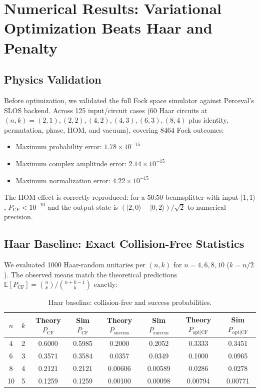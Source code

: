 \section{Numerical Results: Variational Optimization Beats Haar and Penalty}
\label{sec:results}

\subsection{Physics Validation}

Before optimization, we validated the full Fock space simulator against Perceval's SLOS backend. Across 125 input/circuit cases (60 Haar circuits at $(n,k)=(2,1),(2,2),(4,2),(4,3),(6,3),(8,4)$ plus identity, permutation, phase, HOM, and vacuum), covering 8464 Fock outcomes:
\begin{itemize}
\item Maximum probability error: $1.78 \times 10^{-15}$
\item Maximum complex amplitude error: $2.14 \times 10^{-15}$
\item Maximum normalization error: $4.22 \times 10^{-15}$
\end{itemize}
The HOM effect is correctly reproduced: for a 50:50 beamsplitter with input $|1,1\rangle$, $P_{\mathrm{CF}} < 10^{-10}$ and the output state is $(|2,0\rangle - |0,2\rangle)/\sqrt{2}$ to numerical precision.

\subsection{Haar Baseline: Exact Collision-Free Statistics}

We evaluated 1000 Haar-random unitaries per $(n,k)$ for $n=4,6,8,10$ ($k=n/2$). The observed means match the theoretical predictions $\mathbb{E}[P_{\mathrm{CF}}] = \binom{n}{k}/\binom{n+k-1}{k}$ exactly:

\begin{table}[ht]
\centering
\caption{Haar baseline: collision-free and success probabilities.}
\label{tab:haar_baseline}
\begin{tabular}{cccccccc}
\toprule
$n$ & $k$ & Theory $P_{\mathrm{CF}}$ & Sim $P_{\mathrm{CF}}$ & Theory $P_{\mathrm{success}}$ & Sim $P_{\mathrm{success}}$ & Theory $P_{\mathrm{opt|CF}}$ & Sim $P_{\mathrm{opt|CF}}$ \\
\midrule
4 & 2 & 0.6000 & 0.5985 & 0.2000 & 0.2052 & 0.3333 & 0.3451 \\
6 & 3 & 0.3571 & 0.3584 & 0.0357 & 0.0349 & 0.1000 & 0.0965 \\
8 & 4 & 0.2121 & 0.2121 & 0.00606 & 0.00589 & 0.0286 & 0.0278 \\
10 & 5 & 0.1259 & 0.1259 & 0.00100 & 0.00098 & 0.00794 & 0.00771 \\
\bottomrule
\end{tabular}
\end{table}

